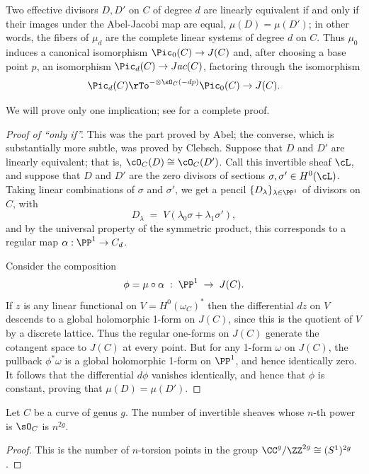 \begin{theorem}\label{abel}
Two effective divisors $D, D'$ on $C$ of degree $d$ are linearly equivalent if and only if their images under the Abel-Jacobi map are equal, $\mu(D) = \mu(D')$; in other words, the fibers of $\mu_d$ are the complete linear systems of degree $d$ on $C$. Thus $\mu_0$ induces a canonical isomorphism
$\Pic_0(C) \to J(C)$ and, after choosing a base point $p$, an isomorphism $\Pic_d(C) \to Jac(C)$, factoring through the isomorphism
$$
\Pic_d(C) \rTo^{-\otimes \sO_C(-dp)} \Pic_0(C) \to J(C).
$$
\end{theorem}

We will prove only one implication; see \cite[Section 2.2]{Griffiths-Harris1978}  for a complete proof.

\begin{proof}[Proof of ``only if'']
This was the part proved by Abel; the converse, which is substantially more subtle, was proved by Clebsch. Suppose that $D$ and $D'$ are linearly equivalent; that is, $\cO_C(D) \cong \cO_C(D')$. Call this invertible sheaf $\cL$, and suppose that $D$ and $D'$ are the zero divisors of sections $\sigma, \sigma' \in H^0(\cL)$.
Taking linear combinations of $\sigma$ and $\sigma'$, we get a pencil $\{D_\lambda\}_{\lambda \in \PP^1}$ of divisors on $C$, with
$$
D_\lambda \; = \; V(\lambda_0\sigma + \lambda_1\sigma'),
$$
and by the universal property of the symmetric product, this corresponds to a regular map $\alpha : \PP^1 \to C_d$. 

Consider the composition
$$
\phi = \mu \circ \alpha \; : \; \PP^1 \; \to \; J(C).
$$
 If $z$ is any linear functional on $V = H^0(\omega_C)^*$ then the differential $dz$  on $V$ descends to a global holomorphic 1-form on
 $J(C)$, since this is the quotient of $V$ by a discrete lattice. Thus the regular one-forms on $J(C)$ generate the cotangent space to $J(C)$ at every point. But for any 1-form $\omega$ on $J(C)$, the pullback $\phi^*\omega$ is a global holomorphic 1-form on $\PP^1$, and hence identically zero. It follows that the differential $d\phi$ vanishes identically, and hence that $\phi$ is constant, proving that $\mu(D) = \mu(D')$.
\end{proof}

\begin{corollary}
Let $C$ be a curve of genus $g$. The number of invertible sheaves whose $n$-th power is $\sO_C$ is $n^{2g}$.
\end{corollary}
\begin{proof}
 This is the number of $n$-torsion points in the group $\CC^g/\ZZ^{2g} \cong (S^1)^{2g}$.
\end{proof}

